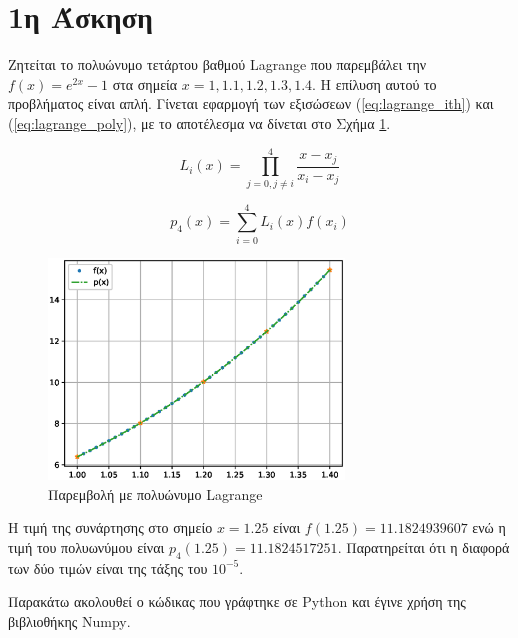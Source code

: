 \documentclass[assignment3.tex]{subfiles}
\begin{document}
\section*{1η Άσκηση}
Ζητείται το πολυώνυμο τετάρτου βαθμού \textlatin{Lagrange} που παρεμβάλει την $f(x)=e^{2x}-1$ στα σημεία $x={1, 1.1, 1.2, 1.3,1.4}$. Η επίλυση αυτού το προβλήματος είναι απλή. Γίνεται εφαρμογή των εξισώσεων (\ref{eq:lagrange_ith}) και (\ref{eq:lagrange_poly}), με το αποτέλεσμα να δίνεται στο Σχήμα \ref{fig:ex1}.

\begin{equation}
L_i(x) = \prod_{j=0, j\neq i}^{4}\frac{x-x_j}{x_i-x_j}
\label{eq:lagrange_ith}
\end{equation}

\begin{equation}
p_4(x) = \sum_{i=0}^{4}L_i(x)f(x_i)
\label{eq:lagrange_poly}
\end{equation}
\begin{figure}[hp]
\includegraphics[width=0.7\textwidth]{ex1.eps}
\centering
\caption{Παρεμβολή με πολυώνυμο \textlatin{Lagrange}}
\label{fig:ex1}
\end{figure}

Η τιμή της συνάρτησης στο σημείο $x=1.25$ είναι $f(1.25)=11.1824939607$ ενώ η τιμή του πολυωνύμου είναι $p_4(1.25)=11.1824517251$. Παρατηρείται ότι η διαφορά των δύο τιμών είναι της τάξης του $10^{-5}$.

Παρακάτω ακολουθεί ο κώδικας που γράφτηκε σε \textlatin{Python} και έγινε χρήση της βιβλιοθήκης \textlatin{Numpy}.

\end{document}
